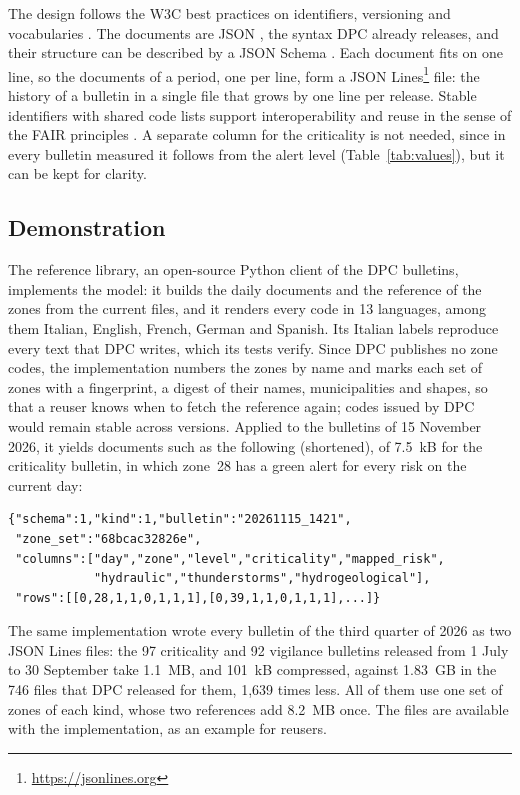 \documentclass[review,authoryear,12pt]{elsarticle}
\newcommand{\Library}{The reference library}
\newcommand{\Library}{\texttt{aiodpc}}
\begin{document}
The design follows the W3C best practices on identifiers, versioning and
vocabularies \citep{loscio2017}. The documents are JSON \citep{bray2017},
the syntax DPC already releases, and their structure can be described by a
JSON Schema \citep{pezoa2016}. Each document fits on one line, so the
documents of a period, one per line, form a JSON
Lines\footnote{\url{https://jsonlines.org}} file: the history of a bulletin
in a single file that grows by one line per release. Stable identifiers with
shared code lists support interoperability and reuse in the sense of the FAIR
principles \citep{wilkinson2016}. A separate column for the
criticality is not needed, since in every bulletin measured it follows from the
alert level (Table~\ref{tab:values}), but it can be kept for clarity.

\subsection{Demonstration}
\label{sec:demonstration}

\Library{}, an open-source Python client of the DPC bulletins, implements the
model: it builds the daily documents and the reference of the zones from the
current files, and it renders every code in 13 languages, among them Italian,
English, French, German and Spanish. Its Italian labels
reproduce every text that DPC writes, which its tests verify. Since DPC
publishes no zone codes, the implementation numbers the zones by name and marks
each set of zones with a fingerprint, a digest of their names, municipalities
and shapes, so that a reuser knows when to fetch the reference again; codes
issued by DPC would remain stable across versions. Applied to the bulletins of
15 November 2026, it yields documents such as the following (shortened), of
7.5~kB for the criticality bulletin, in which zone~28 has a green alert for
every risk on the current day:

\begin{verbatim}
{"schema":1,"kind":1,"bulletin":"20261115_1421",
 "zone_set":"68bcac32826e",
 "columns":["day","zone","level","criticality","mapped_risk",
            "hydraulic","thunderstorms","hydrogeological"],
 "rows":[[0,28,1,1,0,1,1,1],[0,39,1,1,0,1,1,1],...]}
\end{verbatim}

The same implementation wrote every bulletin of the third quarter of 2026 as
two JSON Lines files: the 97 criticality and 92 vigilance bulletins released
from 1 July to 30 September take 1.1~MB, and 101~kB compressed, against
1.83~GB in the 746 files that DPC released for them, 1,639 times less. All of
them use one set of zones of each kind, whose two references add 8.2~MB once.
The files are available with the implementation, as an example for reusers.
\end{document}
